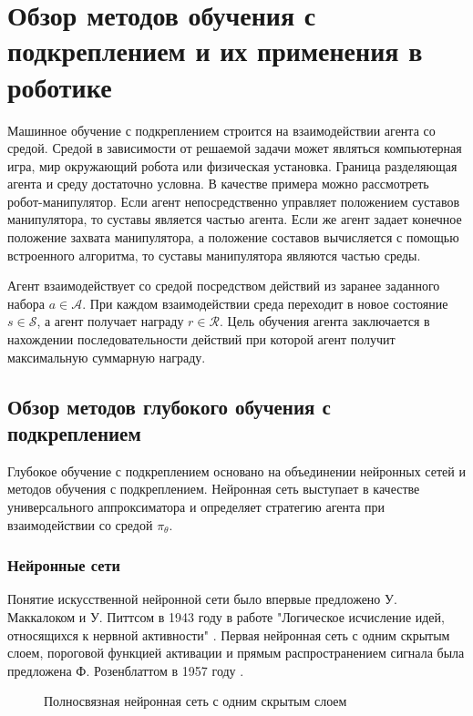 \chapter{Обзор методов обучения с подкреплением и их применения в роботике}\label{ch:ch1}

Машинное обучение с подкреплением строится на взаимодействии агента со средой. Средой в зависимости от решаемой задачи может являться компьютерная игра, мир окружающий робота или физическая установка. Граница разделяющая агента и среду достаточно условна. В качестве примера можно рассмотреть робот-манипулятор. Если агент непосредственно управляет положением суставов манипулятора, то суставы является частью агента. Если же агент задает конечное положение захвата манипулятора, а положение составов вычисляется с помощью встроенного алгоритма, то суставы манипулятора являются частью среды. 

Агент взаимодействует со средой посредством  действий из заранее заданного набора $a \in \mathcal{A}$. При каждом взаимодействии среда переходит в новое состояние $s \in \mathcal{S}$, а агент получает награду $r \in \mathcal{R}$.
Цель обучения агента заключается в нахождении последовательности действий при которой агент получит максимальную суммарную награду. 

\section{Обзор методов глубокого обучения с подкреплением}\label{sec:ch1/sec1}

Глубокое обучение с подкреплением основано на объединении нейронных сетей и методов обучения с подкреплением. Нейронная сеть выступает в качестве универсального аппроксиматора и определяет стратегию агента при взаимодействии со средой $\pi_{\theta}$.

\subsection{Нейронные сети}

Понятие искусственной нейронной сети было впервые предложено У. Маккалоком и У. Питтсом в 1943 году в работе "Логическое исчисление идей, относящихся к нервной активности" \cite{McCulloch1943}. Первая нейронная сеть с одним скрытым слоем, пороговой функцией активации и прямым распространением сигнала была предложена Ф. Розенблаттом в 1957 году \cite{rosenblatt}.

\begin{figure}[ht]
	\caption{Полносвязная нейронная сеть с одним скрытым слоем}
	\label{fig:fcnn}
\end{figure}

